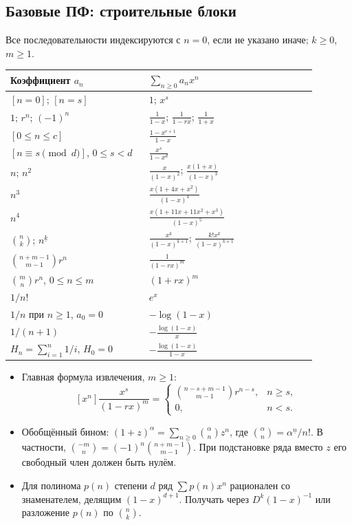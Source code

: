 \subsection{Базовые ПФ: строительные блоки}
Все последовательности индексируются с $n=0$, если не указано иначе; $k\ge0$, $m\ge1$.
\par\smallskip
{\renewcommand{\arraystretch}{1.65}\setlength{\tabcolsep}{3pt}
\begin{tabular}{@{}p{0.43\linewidth}p{0.52\linewidth}@{}}
\textbf{Коэффициент $a_n$} & \textbf{$\sum_{n\ge0}a_nx^n$}\\\hline
$[n=0]$; $[n=s]$ & $1$; $x^s$\\
$1$; $r^n$; $(-1)^n$ & $\frac1{1-x}$; $\frac1{1-rx}$; $\frac1{1+x}$\\
$[0\le n\le c]$ & $\frac{1-x^{c+1}}{1-x}$\\
$[n\equiv s\pmod d]$, $0\le s<d$ & $\frac{x^s}{1-x^d}$\\
$n$; $n^2$ & $\frac{x}{(1-x)^2}$; $\frac{x(1+x)}{(1-x)^3}$\\
$n^3$ & $\frac{x(1+4x+x^2)}{(1-x)^4}$\\
$n^4$ & $\frac{x(1+11x+11x^2+x^3)}{(1-x)^5}$\\
$\binom nk$; $n^{\underline k}$ & $\frac{x^k}{(1-x)^{k+1}}$; $\frac{k!x^k}{(1-x)^{k+1}}$\\
$\binom{n+m-1}{m-1}r^n$ & $\frac1{(1-rx)^m}$\\
$\binom mn r^n$, $0\le n\le m$ & $(1+rx)^m$\\
$1/n!$ & $e^x$\\
$1/n$ при $n\ge1$, $a_0=0$ & $-\log(1-x)$\\
$1/(n+1)$ & $-\frac{\log(1-x)}x$\\
$H_n=\sum_{i=1}^n1/i$, $H_0=0$ & $-\frac{\log(1-x)}{1-x}$\\
\end{tabular}}
\begin{itemize}[leftmargin=*, nosep]
\item Главная формула извлечения, $m\ge1$:
\[
[x^n]\frac{x^s}{(1-rx)^m}=
\begin{cases}\binom{n-s+m-1}{m-1}r^{n-s},&n\ge s,\\0,&n<s.\end{cases}
\]
\item Обобщённый бином: $(1+z)^\alpha=\sum_{n\ge0}\binom\alpha n z^n$, где $\binom\alpha n=\alpha^{\underline n}/n!$. В частности, $\binom{-m}n=(-1)^n\binom{n+m-1}{m-1}$. При подстановке ряда вместо $z$ его свободный член должен быть нулём.
\item Для полинома $p(n)$ степени $d$ ряд $\sum p(n)x^n$ рационален со знаменателем, делящим $(1-x)^{d+1}$. Получать через $D^k(1-x)^{-1}$ или разложение $p(n)$ по $\binom nk$.
\end{itemize}


